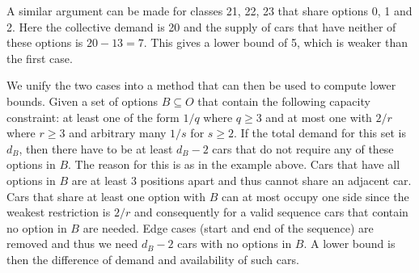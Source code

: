 \documentclass[]{llncs}
\begin{document}
A similar argument can be made for classes 21, 22, 23 that share options 0, 1 and 2. Here the collective demand is 20
and the supply of cars that have neither of these options is $20 - 13 = 7$. This gives a lower bound of 5, which is
weaker than the first case. 


We unify the two cases into a method that can then be used to compute lower bounds. Given a set of options $B\subseteq
O$ that contain the following capacity constraint: at least one of the form $1/q$ where $q \geq 3$ and at most one with
$2/r$ where $r \geq 3$ and arbitrary many $1/s$ for $s \geq 2$. If the total demand for this set is $d_B$, then there
have to be at least $d_B-2$ cars that do not require any of these options in $B$. The reason for this is as in the
example above. Cars that have all options in $B$ are at least 3 positions apart and thus cannot share an adjacent car.
Cars that share at least one option with $B$ can at most occupy one side since the weakest restriction is $2/r$ and
consequently for a valid sequence cars that contain no option in $B$ are needed. Edge cases (start and end of the
sequence) are removed and thus we need $d_B-2$ cars with no options in $B$. A lower bound is then the difference of
demand and availability of such cars. 

\end{document}
